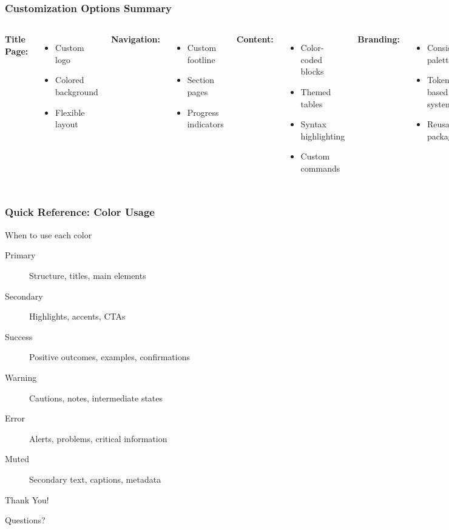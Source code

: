 \documentclass{beamer}
\begin{document}
\begin{frame}
\frametitle{Customization Options Summary}

\begin{columns}
\textbf{Title Page:}
\begin{itemize}
    \item Custom logo
    \item Colored background
    \item Flexible layout
\end{itemize}

\textbf{Navigation:}
\begin{itemize}
    \item Custom footline
    \item Section pages
    \item Progress indicators
\end{itemize}

\textbf{Content:}
\begin{itemize}
    \item Color-coded blocks
    \item Themed tables
    \item Syntax highlighting
    \item Custom commands
\end{itemize}

\textbf{Branding:}
\begin{itemize}
    \item Consistent palette
    \item Token-based system
    \item Reusable package
\end{itemize}
\end{columns}

\end{frame}

\begin{frame}
\frametitle{Quick Reference: Color Usage}

\begin{block}{When to use each color}
\small
\begin{description}
    \item[\textcolor{primary}{Primary}] Structure, titles, main elements
    \item[\textcolor{secondary}{Secondary}] Highlights, accents, CTAs
    \item[\textcolor{success}{Success}] Positive outcomes, examples, confirmations
    \item[\textcolor{warning}{Warning}] Cautions, notes, intermediate states
    \item[\textcolor{error}{Error}] Alerts, problems, critical information
    \item[\textcolor{textSecondary}{Muted}] Secondary text, captions, metadata
\end{description}
\end{block}

\end{frame}

\begin{frame}[plain]
\centering
\Huge Thank You!

\vspace{2em}
\large Questions?

\vspace{1em}
\end{frame}
\end{document}
